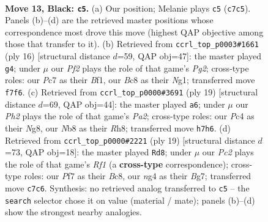 \documentclass[11pt]{article}
\begin{document}
\clearpage

\begin{figure}[p]\centering
\begin{subfigure}{0.46\textwidth}\centering
\resizebox{\linewidth}{!}{%
\newchessgame
\chessboard[
  setfen={rnbr2k1/1pp1bppp/pn1qp3/8/2pP2N1/4B1P1/PP2PPBP/RN1QRK2 b - - 5 13},
  showmover=false,
  pgfstyle=straightmove, color=movearrow, markmove={c7-c5}
]}
\caption{}
\end{subfigure}\hfill
\begin{subfigure}{0.46\textwidth}\centering
\resizebox{\linewidth}{!}{%
\newchessgame
\chessboard[
  setfen={r1bq1rk1/pp2bppp/n2p1n2/4p3/4P3/2NQBP2/PPP3PP/2KR1BNR w - - 1 9},
  showmover=false,
  pgfstyle=straightmove, color=movearrow, markmove={g2-g4}
]}
\caption{}
\end{subfigure}
\\[4pt]
\begin{subfigure}{0.46\textwidth}\centering
\resizebox{\linewidth}{!}{%
\newchessgame
\chessboard[
  setfen={2kr1bnr/ppp3pp/2nqbp2/1B2p3/4P3/N1PP4/PP4PP/R1BQNRK1 b - - 2 10},
  showmover=false,
  pgfstyle=straightmove, color=movearrow, markmove={a7-a6}
]}
\caption{}
\end{subfigure}\hfill
\begin{subfigure}{0.46\textwidth}\centering
\resizebox{\linewidth}{!}{%
\newchessgame
\chessboard[
  setfen={r1b2rk1/pp2ppbp/2n2np1/2p5/4q3/N1P2N2/PP1PBPPP/R1BQR1K1 b - - 7 10},
  showmover=false,
  pgfstyle=straightmove, color=movearrow, markmove={f8-d8}
]}
\caption{}
\end{subfigure}
\caption{\textbf{Move 13, Black: \texttt{c5}.} (a) Our position; Melanie plays \texttt{c5} (\texttt{c7c5}). Panels (b)--(d) are the retrieved master positions whose correspondence most drove this move (highest QAP objective among those that transfer to it). (b) Retrieved from \texttt{ccrl\_top\_p0003\#1661} (ply 16) [structural distance $d$=59, QAP obj=47]: the master played \texttt{g4}; under $\mu$ our \emph{Pf2} plays the role of that game's \emph{Pg2}; cross-type roles: our \emph{P}c7 as their \emph{B}f1, our \emph{B}c8 as their \emph{N}g1; transferred move \texttt{f7f6}. (c) Retrieved from \texttt{ccrl\_top\_p0000\#3691} (ply 19) [structural distance $d$=69, QAP obj=44]: the master played \texttt{a6}; under $\mu$ our \emph{Ph2} plays the role of that game's \emph{Pa2}; cross-type roles: our \emph{P}c4 as their \emph{N}g8, our \emph{N}b8 as their \emph{R}h8; transferred move \texttt{h7h6}. (d) Retrieved from \texttt{ccrl\_top\_p0000\#2221} (ply 19) [structural distance $d$=73, QAP obj=18]: the master played \texttt{Rd8}; under $\mu$ our \emph{Pc2} plays the role of that game's \emph{Rf1} (a \textbf{cross-type} correspondence); cross-type roles: our \emph{P}f7 as their \emph{B}c8, our \emph{n}g4 as their \emph{B}g7; transferred move \texttt{c7c6}. Synthesis: no retrieved analog transferred to \texttt{c5} -- the \texttt{search} selector chose it on value (material / mate); panels (b)--(d) show the strongest nearby analogies.}
\label{fig:thought-m25}
\end{figure}
\end{document}
